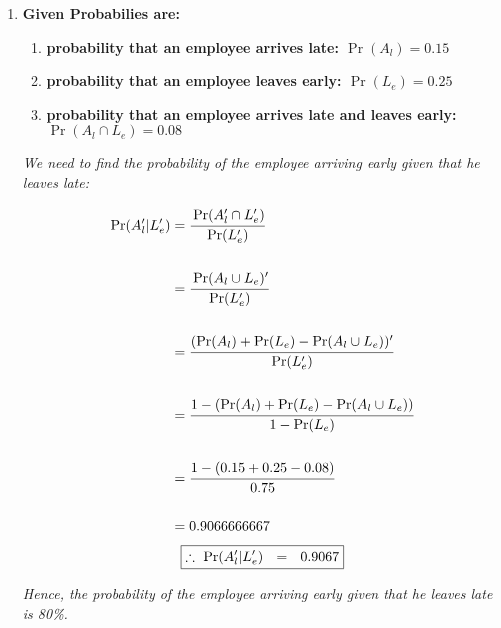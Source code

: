 \documentclass{article}
\begin{document}
\begin{enumerate}
\newpage
\item\textbf{Given Probabilies are:}\\
  \begin{enumerate}
    \item\textbf{probability that an employee arrives late:  $\Pr(A_l) = 0.15$}
    \item\textbf{probability that an employee leaves early:  $\Pr(L_e) = 0.25$}
    \item\textbf{probability that an employee arrives late and leaves early:  $\Pr(A_l \cap L_e) = 0.08$}\\
  \end{enumerate}
  \textit{We need to find the probability of the employee arriving early given that he leaves late: }

  \begin{align*}
    \Pr(A_l' |  L_e') &= \cfrac{\Pr(A_l' \cap L_e')}{\Pr(L_e')}\\\\
    & = \cfrac{\Pr(A_l \cup L_e)'}{\Pr(L_e')}\\\\
    & = \cfrac{(\Pr(A_l) + \Pr(L_e) - \Pr(A_l \cup L_e))'}{\Pr(L_e')}\\\\
    & = \cfrac{1-(\Pr(A_l) + \Pr(L_e) - \Pr(A_l \cup L_e))}{1 - \Pr(L_e)}\\\\
    & = \cfrac{1 - (0.15 + 0.25 - 0.08)}{0.75}\\\\
    & = 0.9066666667\\
  \end{align*}
  \[
     \boxed{\therefore\ \Pr(A_l' |  L_e')\ \ = \ \ 0.9067}\\
  \]

  \textit{Hence, the probability of the employee arriving early given that he leaves late is 80\%.}\\\\


\end{enumerate}
\end{document}
